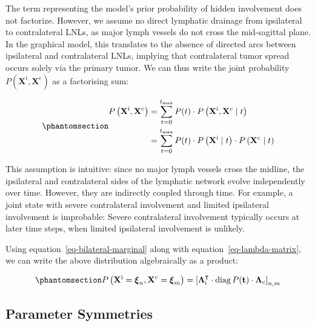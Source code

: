 \documentclass[
  sn-mathphys-num,
]{sn-jnl}
\begin{document}
The term representing the model's prior probability of hidden
involvement does not factorize. However, we assume no direct lymphatic
drainage from ipsilateral to contralateral LNLs, as major lymph vessels
do not cross the mid-sagittal plane. In the graphical model, this
translates to the absence of directed arcs between ipsilateral and
contralateral LNLs, implying that contralateral tumor spread occurs
solely via the primary tumor. We can thus write the joint probability
\(P \left( \mathbf{X}^\text{i}, \mathbf{X}^\text{c} \right)\) as a
factorising sum:

\begin{equation}\phantomsection\label{eq-bilateral-marginal}{
\begin{aligned}
P \left( \mathbf{X}^\text{i}, \mathbf{X}^\text{c} \right) &= \sum_{t=0}^{t_\text{max}} P(t) \cdot P \left( \mathbf{X}^\text{i}, \mathbf{X}^\text{c} \mid t \right) \\
&= \sum_{t=0}^{t_\text{max}} P(t) \cdot P \left( \mathbf{X}^\text{i} \mid t \right) \cdot P \left( \mathbf{X}^\text{c} \mid t \right)
\end{aligned}
}\end{equation}

This assumption is intuitive: since no major lymph vessels cross the
midline, the ipsilateral and contralateral sides of the lymphatic
network evolve independently over time. However, they are indirectly
coupled through time. For example, a joint state with severe
contralateral involvement and limited ipsilateral involvement is
improbable: Severe contralateral involvement typically occurs at later
time steps, when limited ipsilateral involvement is unlikely.

Using equation~\ref{eq-bilateral-marginal} along with
equation~\ref{eq-lambda-matrix}, we can write the above distribution
algebraically as a product:

\begin{equation}\phantomsection\label{eq-bilateral-marginal-algebra}{
P \left( \mathbf{X}^\text{i} = \boldsymbol{\xi}_n, \mathbf{X}^\text{c} = \boldsymbol{\xi}_m \right) = \left[ \boldsymbol{\Lambda}^\intercal_\text{i} \cdot \operatorname{diag} P(\mathbf{t}) \cdot \boldsymbol{\Lambda}_\text{c} \right]_{n,m}
}\end{equation}

\subsection{Parameter Symmetries}\label{sec-params-symmetry}
\end{document}
